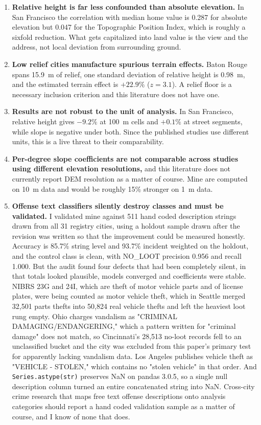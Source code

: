 \documentclass[11pt,letterpaper]{article}
\begin{document}
\begin{enumerate}
\item \textbf{Relative height is far less confounded than absolute elevation.} In San
Francisco the correlation with median home value is 0.287 for absolute elevation but
0.047 for the Topographic Position Index, which is roughly a sixfold reduction. What
gets capitalized into land value is the view and the address, not local deviation from
surrounding ground.

\item \textbf{Low relief cities manufacture spurious terrain effects.} Baton Rouge
spans 15.9~m of relief, one standard deviation of relative height is 0.98~m, and the
estimated terrain effect is $+22.9\%$ ($z = 3.1$). A relief floor is a necessary
inclusion criterion and this literature does not have one.

\item \textbf{Results are not robust to the unit of analysis.} In San Francisco,
relative height gives $-9.2\%$ at 100~m cells and $+0.1\%$ at street segments, while
slope is negative under both. Since the published studies use different units, this is
a live threat to their comparability.

\item \textbf{Per-degree slope coefficients are not comparable across studies using
different elevation resolutions,} and this literature does not currently report DEM
resolution as a matter of course. Mine are computed on 10~m data and would be roughly
15\% stronger on 1~m data.

\item \textbf{Offense text classifiers silently destroy classes and must be
validated.} I validated mine against 511 hand coded description strings drawn from all
31 registry cities, using a holdout sample drawn after the revision was written so
that the improvement could be measured honestly. Accuracy is 85.7\% string level and
93.7\% incident weighted on the holdout, and the control class is clean, with NO\_LOOT
precision 0.956 and recall 1.000. But the audit found four defects that had been
completely silent, in that totals looked plausible, models converged and coefficients
were stable. NIBRS 23G and 24I, which are theft of motor vehicle parts and of license
plates, were being counted as motor vehicle theft, which in Seattle merged 32,501
parts thefts into 50,824 real vehicle thefts and left the heaviest loot rung empty.
Ohio charges vandalism as "CRIMINAL DAMAGING/ENDANGERING," which a pattern written for
"criminal damage" does not match, so Cincinnati's 28,513 no-loot records fell to an
unclassified bucket and the city was excluded from this paper's primary test for
apparently lacking vandalism data. Los Angeles publishes vehicle theft as
"VEHICLE - STOLEN," which contains no "stolen vehicle" in that order. And
\texttt{Series.astype(str)} preserves NaN on pandas 3.0.5, so a single null
description column turned an entire concatenated string into NaN. Cross-city crime
research that maps free text offense descriptions onto analysis categories should
report a hand coded validation sample as a matter of course, and I know of none that
does.
\end{enumerate}
\end{document}
